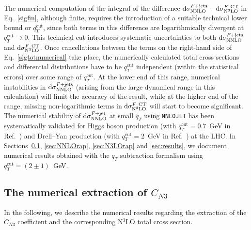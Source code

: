 \documentclass[12pt]{article}
\def\to{\rightarrow}
\DeclareRobustCommand{\qt}{q_T}
\DeclareRobustCommand{\qtcut}{\ensuremath{q_T^\mathrm{cut}}}
\DeclareRobustCommand{\rd}{\ensuremath{\mathrm{d}}}
\begin{document}
The numerical computation of the integral of the difference $\rd{\sigma}_{\rm{NNLO}}^{F+{\rm jets}}-\rd{\sigma}_{\rm{N}^3\rm{LO}}^{F {\rm\ CT}}$ in Eq.~\eqref{sigfin}, although finite, requires the introduction of a suitable technical lower bound or $\qtcut$, since both terms in this difference are logarithmically divergent at $\qtcut \to 0$. 
 This technical cut introduces systematic uncertainties to both $\rd{\sigma}_{\rm{NNLO}}^{F+{\rm jets}}$ and $\rd{\sigma}_{\rm{N}^3\rm{LO}}^{F {\rm\ CT}}$. Once cancellations between the terms on the right-hand side of Eq.~\eqref{sigtotnumerical} take place, the numerically calculated total cross sections and differential distributions have to be $\qtcut$ independent (within the statistical errors) over some range of $\qtcut$. At the lower end of this range, 
numerical instabilities in $\rd{\sigma}_{\rm{NNLO}}^{F+{\rm jets}}$ (arising from the large dynamical range in this calculation) 
will limit the accuracy of the result, while at the 
higher end of the range, missing non-logarithmic terms in  $\rd{\sigma}_{\rm{N}^3\rm{LO}}^{F {\rm\ CT}}$ will start to 
become significant. 
The numerical stability of $\rd{\sigma}_{\rm{NNLO}}^{F+{\rm jet}}$ at small $\qt$ using \texttt{NNLOJET} has been systematically validated for Higgs boson production (with $\qtcut=0.7$~GeV in Ref.~\cite{Chen:2018pzu}) and Drell--Yan production (with $\qtcut=2$~GeV in Ref.~\cite{Bizon:2018foh}) at the LHC. In Sections~\ref{sec:numCN3}, \ref{sec:NNLOrap}, \ref{sec:N3LOrap} and \ref{sec:results}, we document numerical results obtained with the $\qt$ subtraction formalism using $\qtcut=(2\pm 1)$~GeV.



\subsection{The numerical extraction of \texorpdfstring{$C_{N3}$}{CN3}}
\label{sec:numCN3}

In the following, we describe the numerical results regarding the extraction of the $C_{N3}$ coefficient and the corresponding N$^3$LO total cross section. 
\end{document}

